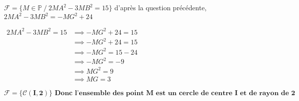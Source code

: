 \documentclass[12pt,a4paper]{article}
\begin{document}
\begin{enumerate}
\begin{enumerate}
                    \( \mathcal{F} = \{ M \in \mathbb{P} \ / \ 2MA^2 - 3MB^2 = 15 \} \) d'après la question précédente, \( 2MA^2 - 3MB^2 = -MG^2 + 24 \)

                    \(
                    \begin{aligned}
                        2MA^2 - 3MB^2 = 15 & \implies -MG^2 + 24 = 15 \\
                                           & \implies -MG^2 + 24 = 15 \\
                                           & \implies -MG^2 = 15 -24  \\
                                           & \implies -MG^2 = -9      \\
                                           & \implies MG^2 = 9        \\
                                           & \implies MG = 3
                    \end{aligned}
                    \)

                    \begin{resultbox}
                        \[
                            \mathbf{\mathcal{F} = \{ \mathcal{C} (I,2)\}\text{   Donc l'ensemble des point \(M\) est un cercle de centre \(I\) et de rayon de 2 }}
                        \]
                    \end{resultbox}
          \end{enumerate}
\end{enumerate}
\end{document}
